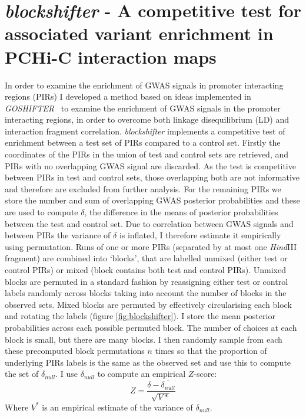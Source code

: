 \documentclass[a4paper,11pt]{report}
\begin{document}
\section{\textit{blockshifter} - A competitive test for associated variant enrichment in PCHi-C interaction maps}
In order to examine the enrichment of GWAS signals in promoter interacting regions (PIRs) I developed a method based on ideas implemented in \textit{GOSHIFTER}~\citep{Trynka2015-wz} to examine the enrichment of GWAS signals in the promoter interacting regions, in order to overcome both linkage disequilibrium (LD) and interaction fragment correlation. \textit{blockshifter} implements a competitive test of enrichment between a test set of PIRs compared to a control set. Firstly the coordinates of the PIRs in the union of test and control sets are retrieved, and PIRs with no overlapping GWAS signal  are discarded. As the test is competitive between PIRs in test and control sets, those overlapping both are not informative and therefore are excluded from further analysis. For the remaining PIRs we store the number and sum of overlapping GWAS posterior probabilities and these are used to compute $\delta$, the difference in the means of posterior probabilities between the test and control set. Due to correlation between GWAS signals and between PIRs the variance of $\delta$ is inflated, I therefore estimate it empirically using permutation.  Runs of one or more PIRs (separated by at most one \textit{Hind}III fragment) are combined into ‘blocks’, that are labelled unmixed (either test or control PIRs) or mixed (block contains both test and control PIRs).  Unmixed blocks are permuted in a standard fashion by reassigning either test or control labels randomly across blocks taking into account the number of blocks in the observed sets. Mixed blocks are permuted by effectively circularising each block and rotating the labels (figure \ref{fig:blockshifter}). I store the mean posterior probabilities across each possible permuted block. The number of choices at each block is small, but there are many blocks. I then randomly sample from each these precomputed block permutations $n$ times so that the proportion of underlying PIRs labels is the same as the observed set and use this to compute the set of $\delta_{null}$. I use $\delta_{null}$ to compute an empirical $Z$-score:
\begin{equation}
Z = \frac{\delta - \bar{\delta_{null}}}{\sqrt{V*}}
\end{equation}
Where $V^{*}$ is an empirical estimate of the variance of $\delta_{null}$. 
\end{document}
